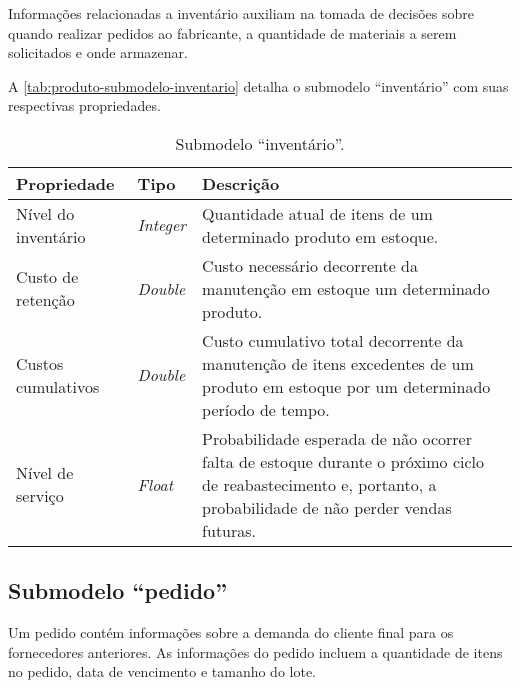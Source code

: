 Informações relacionadas a inventário auxiliam na tomada de decisões sobre quando realizar pedidos ao fabricante, a quantidade de materiais a serem solicitados e onde armazenar.

A \autoref{tab:produto-submodelo-inventario} detalha o submodelo ``inventário'' com suas respectivas propriedades.

\begin{table}[htb]
	\centering
	\caption{Submodelo ``inventário''.}
	\begin{tabular}{p{3.5cm}p{1.5cm}p{9cm}}
		\hline
		\textbf{Propriedade}
		 & \textbf{Tipo}
		 & \textbf{Descrição}                                                                                                                                           \\

		\hline
		Nível do inventário
		 & \textit{Integer}
		 & Quantidade atual de itens de um determinado produto em estoque.                                                                                              \\

		\hline
		Custo de retenção
		 & \textit{Double}
		 & Custo necessário decorrente da manutenção em estoque um determinado produto.                                                                                 \\

		\hline
		Custos cumulativos
		 & \textit{Double}
		 & Custo cumulativo total decorrente da manutenção de itens excedentes de um produto em estoque por um determinado período de tempo.                            \\

		\hline
		Nível de serviço
		 & \textit{Float}
		 & Probabilidade esperada de não ocorrer falta de estoque durante o próximo ciclo de reabastecimento e, portanto, a probabilidade de não perder vendas futuras. \\

		\hline
	\end{tabular}
	\label{tab:produto-submodelo-inventario}
\end{table}

\subsection{Submodelo ``pedido''}

Um pedido contém informações sobre a demanda do cliente final para os fornecedores anteriores. As informações do pedido incluem a quantidade de itens no pedido, data de vencimento e tamanho do lote.

